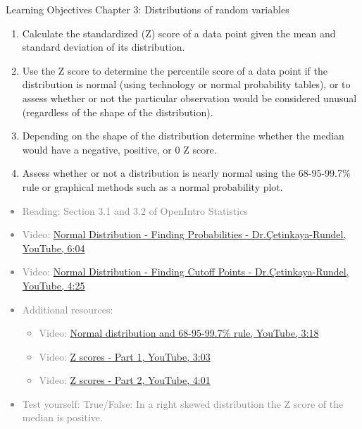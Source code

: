 \documentclass[11pt]{article}
\newcommand{\gray}[1]{\textcolor{gray}{#1}}
\begin{document}
{\LARGE \textcolor{oiB}{Learning Objectives \hfill Chapter 3: Distributions of random variables}} \\

\begin{enumerate}
\renewcommand\labelenumi{\textcolor{oiB}{\textbf{LO \theenumi.}}}

\item Calculate the standardized (Z) score of a data point given the mean and standard deviation of its distribution.

\item Use the Z score to determine the percentile score of a data point if the distribution is normal (using technology or normal probability tables), or to assess whether or not the particular observation would be considered unusual (regardless of the shape of the distribution).

\item Depending on the shape of the distribution determine whether the median would have a negative, positive, or 0 Z score.

\item Assess whether or not a distribution is nearly normal using the 68-95-99.7\% rule or graphical methods such as a normal probability plot.

\end{enumerate}

\gray{
{\it
\vspace{-0.75cm}
\begin{itemize}
\renewcommand{\labelitemi}{{\textcolor{oiB}{$\ast$}}}
\item Reading: Section 3.1 and 3.2 of OpenIntro Statistics
\item Video: \href{http://www.youtube.com/watch?v=ev463hHe544}{Normal Distribution - Finding Probabilities - Dr.\c{C}etinkaya-Rundel, YouTube, 6:04}
\item Video: \href{http://www.youtube.com/watch?v=6rAg4Y6NirU}{Normal Distribution - Finding Cutoff Points - Dr.\c{C}etinkaya-Rundel, YouTube, 4:25}
\item Additional resources:
\begin{itemize}
\item Video: \href{http://www.youtube.com/watch?v=McSFVzc8Swk&list=PL568547ACA9211CCA&index=24}{Normal distribution and 68-95-99.7\% rule, YouTube, 3:18}
\item Video: \href{http://www.youtube.com/watch?v=5v3Czc6ZK-Q&list=PL568547ACA9211CCA&index=23}{Z scores - Part 1, YouTube, 3:03} 
\item Video: \href{http://www.youtube.com/watch?v=aa_deKPDgI4&list=PL568547ACA9211CCA&index=22}{Z scores - Part 2, YouTube, 4:01}
\end{itemize}
\item Test yourself: True/False: In a right skewed distribution the Z score of the median is positive.
\end{itemize}
}}
\end{document}
